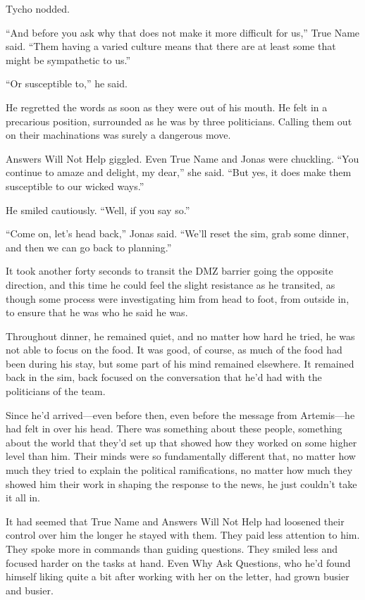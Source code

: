 Tycho nodded.

``And before you ask why that does not make it more difficult for us,'' True Name said. ``Them having a varied culture means that there are at least some that might be sympathetic to us.''

``Or susceptible to,'' he said.

He regretted the words as soon as they were out of his mouth. He felt in a precarious position, surrounded as he was by three politicians. Calling them out on their machinations was surely a dangerous move.

Answers Will Not Help giggled. Even True Name and Jonas were chuckling. ``You continue to amaze and delight, my dear,'' she said. ``But yes, it does make them susceptible to our wicked ways.''

He smiled cautiously. ``Well, if you say so.''

``Come on, let's head back,'' Jonas said. ``We'll reset the sim, grab some dinner, and then we can go back to planning.''

It took another forty seconds to transit the DMZ barrier going the opposite direction, and this time he could feel the slight resistance as he transited, as though some process were investigating him from head to foot, from outside in, to ensure that he was who he said he was.

Throughout dinner, he remained quiet, and no matter how hard he tried, he was not able to focus on the food. It was good, of course, as much of the food had been during his stay, but some part of his mind remained elsewhere. It remained back in the sim, back focused on the conversation that he'd had with the politicians of the team.

Since he'd arrived—even before then, even before the message from Artemis—he had felt in over his head. There was something about these people, something about the world that they'd set up that showed how they worked on some higher level than him. Their minds were so fundamentally different that, no matter how much they tried to explain the political ramifications, no matter how much they showed him their work in shaping the response to the news, he just couldn't take it all in.

It had seemed that True Name and Answers Will Not Help had loosened their control over him the longer he stayed with them. They paid less attention to him. They spoke more in commands than guiding questions. They smiled less and focused harder on the tasks at hand. Even Why Ask Questions, who he'd found himself liking quite a bit after working with her on the letter, had grown busier and busier.

